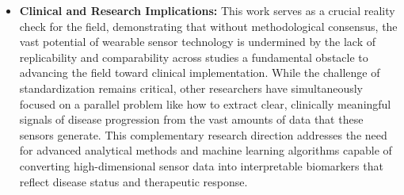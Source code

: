 \documentclass[sigconf,nonacm]{acmart}
\begin{document}
\begin{itemize}
        \item \textbf{Clinical and Research Implications:} This work serves as a crucial reality check for the field, demonstrating that without methodological consensus, the vast potential of wearable sensor technology is undermined by the lack of replicability and comparability across studies a fundamental obstacle to advancing the field toward clinical implementation. While the challenge of standardization remains critical, other researchers have simultaneously focused on a parallel problem like how to extract clear, clinically meaningful signals of disease progression from the vast amounts of data that these sensors generate. This complementary research direction addresses the need for advanced analytical methods and machine learning algorithms capable of converting high-dimensional sensor data into interpretable biomarkers that reflect disease status and therapeutic response.
    \end{itemize}
\end{document}

